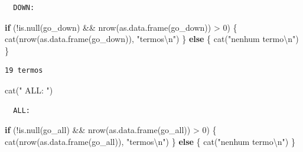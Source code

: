 \documentclass[
  letterpaper,
  DIV=11,
  numbers=noendperiod]{scrreprt}
\newenvironment{Shaded}{\begin{snugshade}}{\end{snugshade}}
\newcommand{\ControlFlowTok}[1]{\textcolor[rgb]{0.00,0.23,0.31}{\textbf{#1}}}
\newcommand{\DecValTok}[1]{\textcolor[rgb]{0.68,0.00,0.00}{#1}}
\newcommand{\FunctionTok}[1]{\textcolor[rgb]{0.28,0.35,0.67}{#1}}
\newcommand{\NormalTok}[1]{\textcolor[rgb]{0.00,0.23,0.31}{#1}}
\newcommand{\SpecialCharTok}[1]{\textcolor[rgb]{0.37,0.37,0.37}{#1}}
\newcommand{\StringTok}[1]{\textcolor[rgb]{0.13,0.47,0.30}{#1}}
\begin{document}
\begin{verbatim}
  DOWN: 
\end{verbatim}

\begin{Shaded}
\begin{Highlighting}[]
\ControlFlowTok{if}\NormalTok{ (}\SpecialCharTok{!}\FunctionTok{is.null}\NormalTok{(go\_down) }\SpecialCharTok{\&\&} \FunctionTok{nrow}\NormalTok{(}\FunctionTok{as.data.frame}\NormalTok{(go\_down)) }\SpecialCharTok{\textgreater{}} \DecValTok{0}\NormalTok{) \{}
  \FunctionTok{cat}\NormalTok{(}\FunctionTok{nrow}\NormalTok{(}\FunctionTok{as.data.frame}\NormalTok{(go\_down)), }\StringTok{"termos}\SpecialCharTok{\textbackslash{}n}\StringTok{"}\NormalTok{)}
\NormalTok{\} }\ControlFlowTok{else}\NormalTok{ \{ }\FunctionTok{cat}\NormalTok{(}\StringTok{"nenhum termo}\SpecialCharTok{\textbackslash{}n}\StringTok{"}\NormalTok{) \}}
\end{Highlighting}
\end{Shaded}

\begin{verbatim}
19 termos
\end{verbatim}

\begin{Shaded}
\begin{Highlighting}[]
\FunctionTok{cat}\NormalTok{(}\StringTok{"  ALL:  "}\NormalTok{)}
\end{Highlighting}
\end{Shaded}

\begin{verbatim}
  ALL:  
\end{verbatim}

\begin{Shaded}
\begin{Highlighting}[]
\ControlFlowTok{if}\NormalTok{ (}\SpecialCharTok{!}\FunctionTok{is.null}\NormalTok{(go\_all) }\SpecialCharTok{\&\&} \FunctionTok{nrow}\NormalTok{(}\FunctionTok{as.data.frame}\NormalTok{(go\_all)) }\SpecialCharTok{\textgreater{}} \DecValTok{0}\NormalTok{) \{}
  \FunctionTok{cat}\NormalTok{(}\FunctionTok{nrow}\NormalTok{(}\FunctionTok{as.data.frame}\NormalTok{(go\_all)), }\StringTok{"termos}\SpecialCharTok{\textbackslash{}n}\StringTok{"}\NormalTok{)}
\NormalTok{\} }\ControlFlowTok{else}\NormalTok{ \{ }\FunctionTok{cat}\NormalTok{(}\StringTok{"nenhum termo}\SpecialCharTok{\textbackslash{}n}\StringTok{"}\NormalTok{) \}}
\end{Highlighting}
\end{Shaded}
\end{document}
